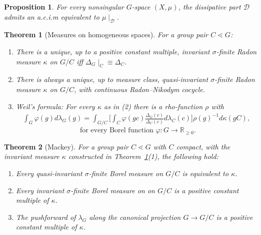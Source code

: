 \documentclass[10pt,a4paper]{amsart}
\newtheorem{thm}{Theorem}
\newtheorem{prop}{Proposition}
\begin{document}
\begin{prop}
\label{prop:dissacim}
For every nonsingular \(G\)-space \(\left(X,\mu\right)\), the dissipative part \(\mathcal{D}\) admits an {\sc a.c.i.m} equivalent to \(\mu\mid_{\mathcal{D}}\).
\end{prop}

\begin{thm}[Measures on homogeneous spaces]
\label{thm:meashom}
For a group pair \(C\lessdot G\):
\begin{enumerate}
    \item There is a unique, up to a positive constant multiple, invariant \(\sigma\)-finite Radon measure \(\kappa\) on \(G/C\) iff \(\varDelta_{G}\mid_{C}\equiv\varDelta_{C}\).
    \item There is always a unique, up to measure class, quasi-invariant \(\sigma\)-finite Radon measure \(\kappa\) on \(G/C\), with continuous Radon--Nikodym cocycle.
    \item \emph{Weil's formula}: For every \(\kappa\) as in (2) there is a rho-function \(\rho\) with
    \begin{equation}
    \begin{aligned}
    \label{eq:weil1}
    \int_{G}\varphi\left(g\right)d\lambda_{G}\left(g\right)=\int_{G/C}\Big[\int_{C}\varphi\left(gc\right){\textstyle \frac{\varDelta_{G}\left(c\right)}{\varDelta_{C}\left(c\right)}}d\lambda_{C}\left(c\right)\Big]\rho\left(g\right)^{-1}d\kappa\left(gC\right),
    \end{aligned}
    \end{equation}
    \[\text{ for every Borel function } \varphi:G\to\mathbb{R}_{\geq 0}.\]
\end{enumerate}
\end{thm}

\begin{thm}[Mackey]
\label{thm:haaruniq}
For a group pair \(C\lessdot G\) with \(C\) compact, with the invariant measure \(\kappa\) constructed in Theorem~\ref{thm:meashom}(1), the following hold:
\begin{enumerate}
    \item Every quasi-invariant \(\sigma\)-finite Borel measure on \(G/C\) is equivalent to \(\kappa\).
    \item Every invariant \(\sigma\)-finite Borel measure on on \(G/C\) is a positive constant multiple of \(\kappa\).
    \item The pushforward of \(\lambda_{G}\) along the canonical projection \(G\to G/C\) is a positive constant multiple of \(\kappa\).
\end{enumerate}
\end{thm}
\end{document}
